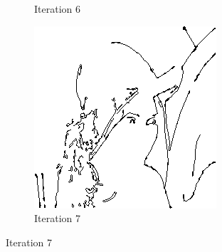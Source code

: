 \documentclass{llncs}
\begin{document}
\begin{figure}
\begin{subfigure}[b]{0.3\textwidth}
                \caption{Iteration 6}
                \label{fig:search_iter6}
        \end{subfigure}
        \quad
        \begin{subfigure}[b]{0.3\textwidth}
                \includegraphics[width=\textwidth]{IMG/ImprovedSearch/Iteration7}
                \caption{Iteration 7}
                \label{fig:search_iter7}
        \end{subfigure}
        
        \vspace{5mm}
        

\end{figure}
\end{document}
